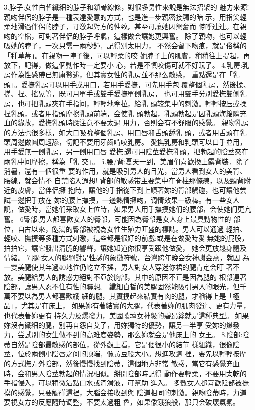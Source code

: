 \documentclass[12pt,UTF8]{ctexbook}
\begin{document}
3.脖子:女性白皙纖細的脖子和鎖骨線條，對很多男性來說是無法招架的
魅力來源!親吻伴侶的脖子是一種表達愛意的方式，也是進一步親密接觸的暗
示，用指尖輕柔地滑過伴侶的脖子，可激起對方的性致，甚至可讓她因興奮而
惊呼連連。在親吻的空檔，可對著伴侶的脖子呼氣，這樣做会讓她更興奮。
除了親吻，也可以輕吸她的脖子，一次只需一兩秒鐘，記得別太用力，
不然会留下吻痕，就是俗稱的「種草莓」。在親吻一陣子後，可以輕柔的咬
她脖子上的肌膚，稍稍往上提起，再放下，記得，做這個動作時一定要小
心，若是不慎咬傷可就不好玩了。
4.乳房:乳房作為性感帶已無庸贅述，但其實女性的乳房並不那么敏感，
重點還是在「乳頭」。愛撫乳房可以用手或用口，若用手愛撫，可先用手包
覆整個乳房，然後揉、搓、捏、搖晃等，既可用單手或雙手愛撫單側乳房，
也可用雙手分別愛撫雙側乳房，也可把乳頭夾在手指间，輕輕地牽拉，給乳
頭较集中的刺激。輕輕按压或揉捏乳頭，或者用指頭摩擦乳頭前端，会使乳
頭勃起，乳頭勃起是因乳頭海綿體充血的緣故，愛撫乳頭時應注意不要太過
用力，否則会有不舒服的感覺。
親吻乳房的方法也很多樣，如大口吸吮整個乳房、用口唇和舌頭舔乳
頭，或者用舌頭在乳頭周邊做圓周輕舔，切記不要用牙齒啃咬乳房。
愛撫乳房和乳頭可以口手並用，用手愛無一側乳房，另一側用口唇
愛撫;還可用陰莖愛撫乳頭，把勃起的陰莖夾在兩乳中间摩擦，稱為「乳
交」。
5.腰/背:夏天一到，美眉们喜歡換上露背裝，除了消暑，還有一個很重
要的作用，就是吸引男人的目光，當男人看到女人的美背、腰線，就会情不
自禁陷入遐想!
背部的敏感带主要集中在脊柱那條線，以及頸背附近的皮膚，當伴侶擁
抱時，讓他的手指從下到上順著妳的背部觸碰，也可讓他尝試一邊把手放在
妳的腰上撫摸，一邊熱情擁吻，调情效果一級棒。有一些女人說，做愛時，當她们采取女上位時，如果男人用手撫摸她们的腰部，会使她们更亢奮。
6臀部:男人都喜歡女人的臀部，可能因為臀部是女人身上最具動物性的
部位，自古以來，飽滿的臀部被視為女性生殖力旺盛的標誌。男人可以通過
輕拍、輕咬、撫摸等多種方式刺激，這些都是很好的前戲;或是在做愛時愛
無她的屁股，拍拍它，讓它發出清脆的響聲，讓她知道你很享受跟他做愛，
她会更放鬆身體及情緒。
7.腿:女人的腿絕對是性感的象徵符號，台灣跨年晚会女神謝金燕，就因
為一雙美腿使其年過40地位仍屹立不搖，男人對女人穿迷你裙的腿肯定会盯
著不放。美腿給男人的誘惑力絕對不亞於胸部，其中的原因不正是因為腿的
根部連著陰部，讓男人忍不住有性的聯想。
纖細白皙的美腿固然能吸引男人的眼光，但千萬不要以為男人都喜歡纖
細的腿，其實摸起來結實有肉的腿，才稱得上是「極品」，尤其是在床上，
如果妳有著結實的大腿，代表著妳的肌肉發達、更有力量，也代表著妳更有
持久力及爆發力，美國歌壇女神級的碧昂絲就是這種典型。
如果妳沒有纖細的腿，別再自怨自艾了，用妳獨特的優勢，讓另一半享
受妳的爆發力，尝試別的女生做不到的高难度姿勢，那么妳就会是他床上的
女王。
8.陰部:陰蒂自然是陰部最敏感的部位，從外觀上看，它是個很小的結节
樣組織，很像陰莖，位於兩側小陰唇之间的顶端，像黃豆般大小。想進攻這
裡，要先以輕輕按摩的方式撫弄外陰部，然後慢慢找到陰蒂，這個地方非常
敏感，當它有感覺充血時，会和男人陰莖勃起的情況相似。掰開陰部時記得
動作要輕柔，不要用太乾的手指侵入，可以稍微沾點口水或潤滑液，可幫助
進入。
多數女人都喜歡陰部被撫摸的感覺，只要觸碰這裡，大腦会接收到與
陰道相同的刺激。親吻陰蒂時，力道要視女方的反應隨時调整，不要太過粗
魯，如果像餓狼般，那只会破壞氣氛。
\end{document}
